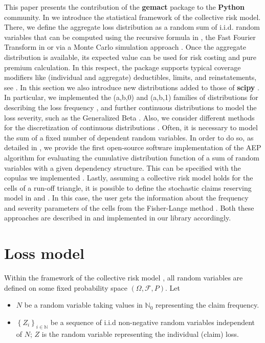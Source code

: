\documentclass{article}
\begin{document}
This paper presents the contribution of the \textbf{gemact} package to the \textbf{Python} community.
In  we introduce the statistical framework of the collective risk model. There, we define the aggregate loss distribution as a random sum of i.i.d. random variables that can be computed using the recursive formula in \cite{panjer81}, the Fast Fourier Transform in \cite{heckman83} or via a Monte Carlo simulation approach \cite[p.~467]{klugman98}. Once the aggregate distribution is available, its expected value can be used for risk costing and pure premium calculation. In this respect, the package supports typical coverage modifiers like (individual and aggregate) deductibles, limits, and reinstatements, see \cite{Sundt93}. In this section we also introduce new distributions added to those of \textbf{scipy} \cite{scipy}. In particular, we implemented the (a,b,0) and (a,b,1) families of distributions for describing the loss frequency \cite[p.~505]{klugman98}, and further continuous distributions to model the loss severity, such as the Generalized Beta \cite[p.~493]{klugman98}. Also, we consider different methods for the discretization of continuous distributions \cite{gerber82}.
\newline
Often, it is necessary to model the sum of a fixed number of dependent random variables. In order to do so, as detailed in , we provide the first open-source software implementation of the AEP algorithm \cite{arbenz11} for evaluating the cumulative distribution function of a sum of random variables with a given dependency structure. This can be specified with the copulas we implemented \cite{nelsen07}. 
\newline
Lastly, assuming a collective risk model holds for the cells of a run-off triangle, it is possible to define the stochastic claims reserving model in \cite{ricotta16} and \cite{clemente19}. In this case, the user gets the information about the frequency and severity parameters of the cells from the Fisher-Lange method \cite{fisher99}. Both these approaches are described in  and implemented in our library accordingly.


\section{Loss model}
\label{sec:lossmodel}

Within the framework of the collective risk model \cite{embrechts09}, all random variables are defined on some fixed probability space $(\Omega, \mathcal{F}, P)$. Let
\begin{itemize}
    \item $N$ be a random variable taking values in $\mathbb{N}_0$ representing the claim frequency.
    \item $\left\{ Z_i\right\}_{i \in \mathbb{N}}$ be a sequence of i.i.d non-negative random variables independent of $N$; $Z$ is the random variable representing the individual (claim) loss.
\end{itemize}
\end{document}
